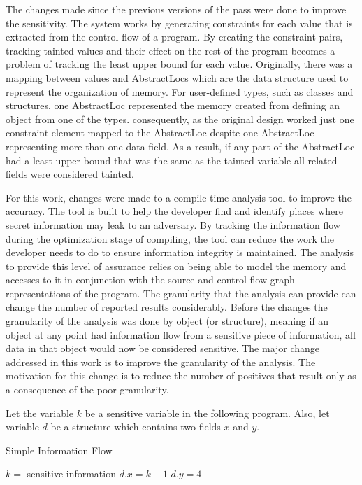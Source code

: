 \documentclass[11pt,a4paper]{article}
\begin{document}
  The changes made since the previous versions of the pass were done to improve
  the sensitivity. The system works by generating constraints for each value that
  is extracted from the control flow of a program. By creating the constraint
  pairs, tracking tainted values and their effect on  the rest of the program
  becomes a problem of tracking the least upper bound for each value.  Originally,
  there was a mapping between values and AbstractLocs which are the data structure
  used to represent the organization of memory. For user-defined types, such as
  classes and structures, one AbstractLoc represented the memory created from
  defining an object from one of the types. consequently, as the original design
  worked just one constraint element mapped to the AbstractLoc despite one
  AbstractLoc representing more than one data field. As a result, if any part of
  the AbstractLoc had a least upper bound that was the same as the tainted
  variable all related fields were considered tainted.

  For this work, changes were made to a compile-time analysis tool to improve the
  accuracy. The tool is built to help the developer find and identify places where
  secret information may leak to an adversary. By tracking the information flow
  during the optimization stage of compiling, the tool can reduce the work the
  developer needs to do to ensure information integrity is maintained. The
  analysis to provide this level of assurance relies on being able to model the
  memory and accesses to it in conjunction with the source and control-flow graph
  representations of the program. The granularity that the analysis can provide
  can change the number of reported results considerably. Before the changes the
  granularity of the analysis was done by object (or structure), meaning if an
  object at any point had information flow from a sensitive piece of information,
  all data in that object would now be considered sensitive. The major change
  addressed in this work is to improve the granularity of the analysis. The
  motivation for this change is to reduce the number of positives that result only
  as a consequence of the poor granularity.

  Let the variable $k$ be a sensitive variable in the following program. Also, let
  variable $d$ be a structure which contains two fields $x$ and $y$.

  \begin{algorithm}
    \caption{Simple Information Flow}
  \begin{algorithmic}
    \State $k =$ sensitive information
    \State $d.x =  k + 1$
    \State $d.y = 4$
  \end{algorithmic}
  \end{algorithm}
\end{document}
